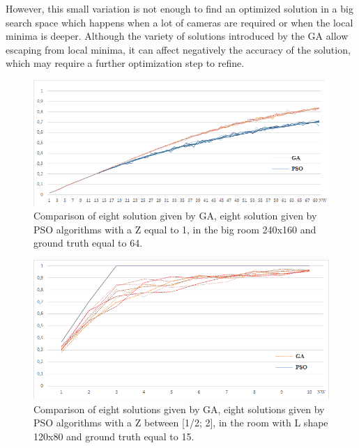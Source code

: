 However, this small variation is not enough to find an optimized solution in a big search space which happens when a lot of cameras are required or when the local minima is deeper. Although the variety of solutions introduced by the GA allow escaping from local minima, it can affect negatively the accuracy of the solution, which may require a further optimization step to refine. 





\begin{figure}[!htb]
  \includegraphics[width=\linewidth]{figures/GAPSObigRoomz1ters.png}
  \caption{ Comparison of  eight solution given by GA,  eight solution given by PSO algorithms with a Z equal to 1, in the big room 240x160 and ground truth equal to 64.}\label{fig:bigRz1}
   \endminipage\hfill
\end{figure}

\vfill
\hfill

\begin{figure}[!htb]
  \includegraphics[width=\linewidth]{figures/GAPSORoomLz2bis.png}
  \caption{Comparison of eight solutions given by GA, eight solutions given by PSO algorithms with a Z between [1/2; 2], in the room with L shape 120x80 and ground truth equal to 15.}\label{fig:RLz2}
   \endminipage\hfill
\end{figure}

